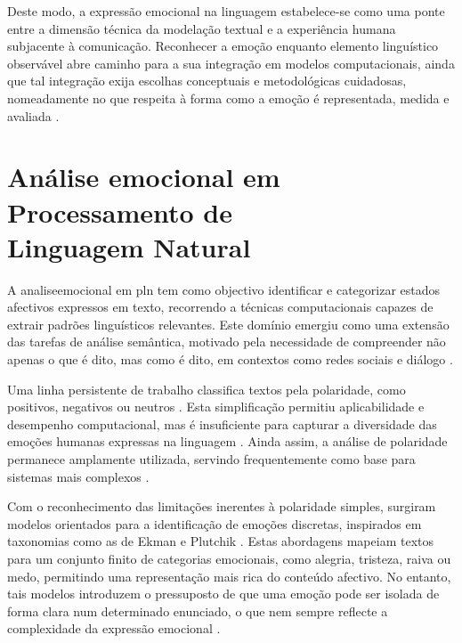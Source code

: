 Deste modo, a expressão emocional na linguagem estabelece-se como uma ponte entre a dimensão técnica da modelação textual e a experiência humana subjacente à comunicação. Reconhecer a emoção enquanto elemento linguístico observável abre caminho para a sua integração em modelos computacionais, ainda que tal integração exija escolhas conceptuais e metodológicas cuidadosas, nomeadamente no que respeita à forma como a emoção é representada, medida e avaliada \parencite{BuechelHahn2016Regression, MohammadTurney2013Lexicon}.


\section[Análise emocional em Processamento de Linguagem Natural]%
{Análise emocional em Processamento de\\ 
Linguagem Natural}
\label{sec:analise_emocional}

A \gls{analiseemocional} em \gls{pln} tem como objectivo identificar e categorizar estados afectivos expressos em texto, recorrendo a técnicas computacionais capazes de extrair padrões linguísticos relevantes. Este domínio emergiu como uma extensão das tarefas de análise semântica, motivado pela necessidade de compreender não apenas o que é dito, mas como é dito, em contextos como redes sociais e diálogo \parencite{Tan2023Survey, PlazaDelArco2024Trends}.

Uma linha persistente de trabalho classifica textos pela polaridade, como positivos, negativos ou neutros \parencite{Tan2023Survey}. Esta simplificação permitiu aplicabilidade e desempenho computacional, mas é insuficiente para capturar a diversidade das emoções humanas expressas na linguagem \parencite{Seyeditabari2018Review}. Ainda assim, a análise de polaridade permanece amplamente utilizada, servindo frequentemente como base para sistemas mais complexos \parencite{Tan2023Survey}.

Com o reconhecimento das limitações inerentes à polaridade simples, surgiram modelos orientados para a identificação de emoções discretas, inspirados em taxonomias como as de Ekman e Plutchik \parencite{Seyeditabari2018Review, PlazaDelArco2024Trends}. Estas abordagens mapeiam textos para um conjunto finito de categorias emocionais, como alegria, tristeza, raiva ou medo, permitindo uma representação mais rica do conteúdo afectivo. No entanto, tais modelos introduzem o pressuposto de que uma emoção pode ser isolada de forma clara num determinado enunciado, o que nem sempre reflecte a complexidade da expressão emocional \parencite{PlazaDelArco2024Trends}.

